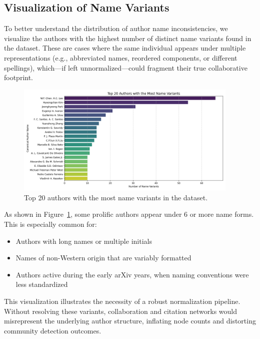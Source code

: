 \documentclass[12pt]{article}
\begin{document}
\subsection{Visualization of Name Variants}

To better understand the distribution of author name inconsistencies, we visualize the authors with the highest number of distinct name variants found in the dataset. These are cases where the same individual appears under multiple representations (e.g., abbreviated names, reordered components, or different spellings), which—if left unnormalized—could fragment their true collaborative footprint.

\begin{figure}[H]
    \centering
    \includegraphics[width=0.95\textwidth]{pictures/top_author_name_variants.png}
    \caption{Top 20 authors with the most name variants in the dataset.}
    \label{fig:name_variants_bar}
\end{figure}

As shown in Figure~\ref{fig:name_variants_bar}, some prolific authors appear under 6 or more name forms. This is especially common for:
\begin{itemize}
    \item Authors with long names or multiple initials
    \item Names of non-Western origin that are variably formatted
    \item Authors active during the early arXiv years, when naming conventions were less standardized
\end{itemize}

This visualization illustrates the necessity of a robust normalization pipeline. Without resolving these variants, collaboration and citation networks would misrepresent the underlying author structure, inflating node counts and distorting community detection outcomes.
\end{document}

